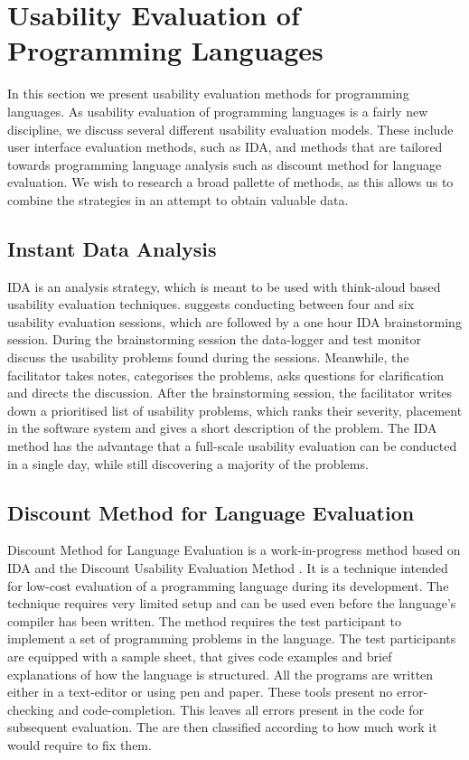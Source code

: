 \section{Usability Evaluation of Programming Languages} \label{sec:prog-usability}
In this section we present usability evaluation methods for programming languages. As usability evaluation of programming languages is a fairly new discipline, we discuss several different usability evaluation models. These include user interface evaluation methods, such as \gls{IDA}, and methods that are tailored towards programming language analysis such as discount method for language evaluation. We wish to research a broad pallette of methods, as this allows us to combine the strategies in an attempt to obtain valuable data.

\subsection{Instant Data Analysis} \label{sec:ida}
\gls{IDA} is an analysis strategy, which is meant to be used with think-aloud based usability evaluation techniques\cite{kjeldskov2004instant}. \cite{kjeldskov2004instant} suggests conducting between four and six usability evaluation sessions, which are followed by a one hour \gls{IDA} brainstorming session. During the brainstorming session the data-logger and test monitor discuss the usability problems found during the sessions. Meanwhile, the facilitator takes notes, categorises the problems, asks questions for clarification and directs the discussion. After the brainstorming session, the facilitator writes down a prioritised list of usability problems, which ranks their severity, placement in the software system and gives a short description of the problem. The \gls{IDA} method has the advantage that a full-scale usability evaluation can be conducted in a single day, while still discovering a majority of the problems\cite{kjeldskov2004instant}.

\subsection{Discount Method for Language Evaluation} \label{sec:discount-method}
Discount Method for Language Evaluation is a work-in-progress method based on \gls{IDA}\cite{kurtev2016discount} and the Discount Usability Evaluation Method \cite{benyon2014designing}. It is a technique intended for low-cost evaluation of a programming language during its development. The technique requires very limited setup and can be used even before the language's compiler has been written. The method requires the test participant to implement a set of programming problems in the language. The test participants are equipped with a sample sheet, that gives code examples and brief explanations of how the language is structured. All the programs are written either in a text-editor or using pen and paper. These tools present no error-checking and code-completion. This leaves all errors present in the code for subsequent evaluation. The are then classified according to how much work it would require to fix them.

